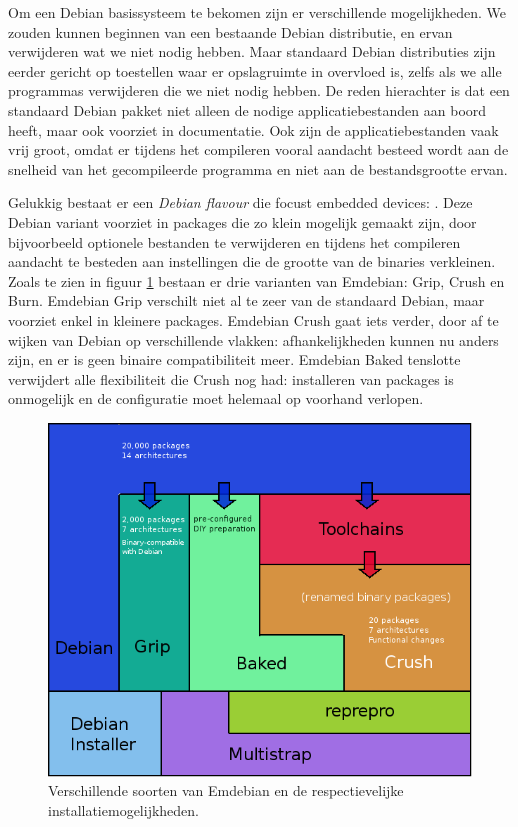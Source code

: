 Om een Debian basissysteem te bekomen zijn er verschillende mogelijkheden. We zouden kunnen beginnen van een bestaande Debian distributie, en ervan verwijderen wat we niet nodig hebben. Maar standaard Debian distributies zijn eerder gericht op toestellen waar er opslagruimte in overvloed is, zelfs als we alle programmas verwijderen die we niet nodig hebben. De reden hierachter is dat een standaard Debian pakket niet alleen de nodige applicatiebestanden aan boord heeft, maar ook voorziet in documentatie. Ook zijn de applicatiebestanden vaak vrij groot, omdat er tijdens het compileren vooral aandacht besteed wordt aan de snelheid van het gecompileerde programma en niet aan de bestandsgrootte ervan.

Gelukkig bestaat er een \emph{Debian flavour} die focust embedded devices: . Deze Debian variant voorziet in packages die zo klein mogelijk gemaakt zijn, door bijvoorbeeld optionele bestanden te verwijderen en tijdens het compileren aandacht te besteden aan instellingen die de grootte van de binaries verkleinen. Zoals te zien in figuur \ref{fig:emdebian:flavours} bestaan er drie varianten van Emdebian: Grip, Crush en Burn. Emdebian Grip verschilt niet al te zeer van de standaard Debian, maar voorziet enkel in kleinere packages. Emdebian Crush gaat iets verder, door af te wijken van Debian op verschillende vlakken: afhankelijkheden kunnen nu anders zijn, en er is geen binaire compatibiliteit meer. Emdebian Baked tenslotte verwijdert alle flexibiliteit die Crush nog had: installeren van packages is onmogelijk en de configuratie moet helemaal op voorhand verlopen.

\begin{figure}
	\includegraphics[width=\textwidth]{afbeeldingen/emdebian_soorten}
	\caption{Verschillende soorten van Emdebian en de respectievelijke installatiemogelijkheden.}
	\label{fig:emdebian:flavours}
\end{figure}

